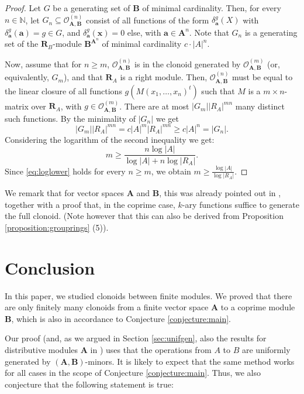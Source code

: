 \documentclass[11pt]{amsart}
\theoremstyle{plain}
\theoremstyle{definition}
\newcommand{\N}{{\mathbb N}}
\newcommand{\alg}[1]{\mathbf{#1}}
\newcommand{\clonoid}[1]{\mathcal{#1}}
\newcommand{\clodO}{\clonoid{O}}
\newcommand{\algA}{\alg{A}}
\newcommand{\algB}{\alg{B}}
\newcommand{\algR}{\alg{R}}
\renewcommand\vec{\mathbf}
\newcommand{\va}{\vec{a}}
\newcommand{\vx}{\vec{x}}
\begin{document}
\begin{proof}
Let $G$ be a generating set of $\algB$ of minimal cardinality. Then, for every $n \in \N$, let $G_n \subseteq \clodO_{\algA,\algB}^{(n)}$ consist of all functions of the form $\delta_{\va}^g(X)$ with $\delta_{\va}^g(\va) = g \in G$, and $\delta_{\va}^g(\vx) = 0$ else, with  $\va \in \algA^n$. Note that $G_n$ is a generating set of the $\algR_B$-module $\algB^{\algA^n}$ of minimal cardinality $c\cdot |A|^n$. 

Now, assume that for $n \geq m$, $\clodO_{\algA,\algB}^{(n)}$ is in the clonoid generated by $\clodO_{\algA,\algB}^{(m)}$ (or, equivalently, $G_m$), and that $\algR_A$ is a right module. Then, $\clodO_{\algA,\algB}^{(n)}$ must be equal to the linear closure of all functions $g(M(x_1,\ldots,x_n)^t)$ such that $M$ is a $m\times n$-matrix over $\algR_A$, with $g \in \clodO_{\algA,\algB}^{(m)}$. There are at most $|G_m||R_A|^{mn}$ many distinct such functions. By the minimality of $|G_n|$ we get 
$$|G_m||R_A|^{mn} = c|A|^m|R_A|^{mn} \geq c|A|^n = |G_n|.$$
Considering the logarithm of the second inequality we get:
\begin{equation}\label{eq:loglower}
 m \geq \frac{n \log |A|}{\log |A| + n \log |R_A|}.   
\end{equation}
Since \eqref{eq:loglower} holds for every $n \geq m$, we obtain $m \geq \frac{\log|A|}{\log|R_A|}$.
\end{proof}

We remark that for vector spaces $\algA$ and $\algB$, this was already pointed out in \cite{vanecek-thesis}, together with a proof that, in the coprime case, $k$-ary functions suffice to generate the full clonoid. (Note however that this can also be derived from Proposition \ref{proposition:grouprings} (5)).

\section{Conclusion}\label{sec:conclusion}

In this paper, we studied clonoids between finite modules. We proved that there are only finitely many clonoids from a finite vector space $\algA$ to a coprime module $\algB$, which is also in accordance to Conjecture \ref{conjecture:main}.

Our proof (and, as we argued in Section \ref{sec:unifgen}, also the results for distributive modules $\algA$ in \cite{MW-clonoidsmodules}) uses that the operations from $A$ to $B$ are uniformly generated by $(\algA,\algB)$-minors. It is likely to expect that the same method works for all cases in the scope of Conjecture \ref{conjecture:main}. Thus, we also conjecture that the following statement is true:
\end{document}
